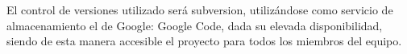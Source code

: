 El control de versiones utilizado será subversion, utilizándose como servicio de almacenamiento el de Google: Google Code, dada su elevada disponibilidad, siendo de esta manera accesible el proyecto para todos los miembros del equipo.

